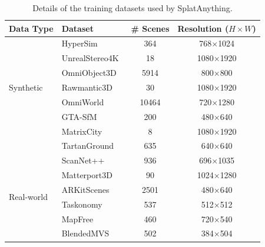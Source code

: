 \vspace{-0.15in}
\begin{table}[h]
    \centering
    \caption{
        Details of the training datasets used by SplatAnything.
    }
    \vspace{0.1in}
    \label{tab:training_data}
    \setlength{\tabcolsep}{9pt}
    \renewcommand{\arraystretch}{1.0}
    \begin{tabular}{@{}llcc@{}}
        \toprule
        \textbf{Data Type} & \textbf{Dataset} & \textbf{\# Scenes} & \textbf{Resolution ($H \times W$)} \\
        \midrule
        \multirow{7}{*}{Synthetic}
        & HyperSim~\citep{roberts2021hypersim}     & 364 & 768$\times$1024 \\
        & UnrealStereo4K~\citep{tosi2021smd}     & 18 & 1080$\times$1920 \\
        & OmniObject3D~\citep{wu2023omniobject3d} & 5914 & 800$\times$800 \\
        & Rawmantic3D~\citep{rawmantic2026data}    & 30 & 1080$\times$1920 \\
        & OmniWorld~\citep{zhou2025omniworld}     & 10464 & 720$\times$1280 \\
        & GTA-SfM~\citep{wang2020flow}      & 200 & 480$\times$640 \\
        & MatrixCity~\citep{li2023matrixcity}   & 8 & 1080$\times$1920 \\
        & TartanGround~\citep{patel2025tartanground} & 635 & 640$\times$640 \\
        \midrule
        \multirow{7}{*}{Real-world}
        & ScanNet++~\citep{yeshwanth2023scannet++}   & 936 & 696$\times$1035 \\
        & Matterport3D~\citep{chang2017matterport3d}  & 90 & 1024$\times$1280 \\
        & ARKitScenes~\citep{baruch2021arkitscenes} & 2501 & 480$\times$640 \\
        & Taskonomy~\citep{zamir2018taskonomy}   & 537 & 512$\times$512 \\
        & MapFree~\citep{arnold2022map}     & 460 & 720$\times$540 \\
        & BlendedMVS~\citep{yao2020blendedmvs}  & 502 & 384$\times$504 \\
        \bottomrule
    \end{tabular}
\end{table}
\vspace{-0.15in}